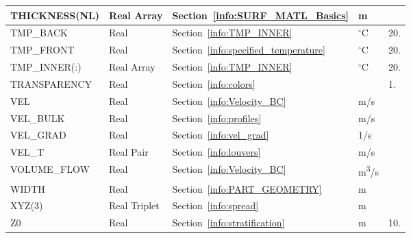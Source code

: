 \documentclass[11pt]{book}
\begin{document}
\begin{longtable}{@{\extracolsep{\fill}}|l|l|l|l|l|}
{\ct THICKNESS(NL)}                   & Real Array      & Section~\ref{info:SURF_MATL_Basics}       & m                   &                         \\ \hline
{\ct TMP\_BACK}                       & Real            & Section~\ref{info:TMP_INNER}              & $^\circ$C           & 20.                     \\ \hline
{\ct TMP\_FRONT}                      & Real            & Section~\ref{info:specified_temperature}  & $^\circ$C           & 20.                     \\ \hline
{\ct TMP\_INNER(:)}                   & Real Array      & Section~\ref{info:TMP_INNER}              & $^\circ$C           & 20.                     \\ \hline
{\ct TRANSPARENCY}                    & Real            & Section~\ref{info:colors}                 &                     & 1.                      \\ \hline
{\ct VEL    }                         & Real            & Section~\ref{info:Velocity_BC}            & m/s                 &                         \\ \hline
{\ct VEL\_BULK}                       & Real            & Section~\ref{info:profiles}               & m/s                 &                         \\ \hline
{\ct VEL\_GRAD}                       & Real            & Section~\ref{info:vel_grad}               & 1/s                 &                         \\ \hline
{\ct VEL\_T }                         & Real Pair       & Section~\ref{info:louvers}                & m/s                 &                         \\ \hline
{\ct VOLUME\_FLOW}                    & Real            & Section~\ref{info:Velocity_BC}            & \si{m^3/s}          &                         \\ \hline
{\ct WIDTH}                           & Real            & Section~\ref{info:PART_GEOMETRY}          & m                   &                         \\ \hline
{\ct XYZ(3)}                          & Real Triplet    & Section~\ref{info:spread}                 & m                   &                         \\ \hline
{\ct Z0 }                             & Real            & Section~\ref{info:stratification}         & m                   & 10.                     \\ \hline
\end{longtable}
\end{document}
